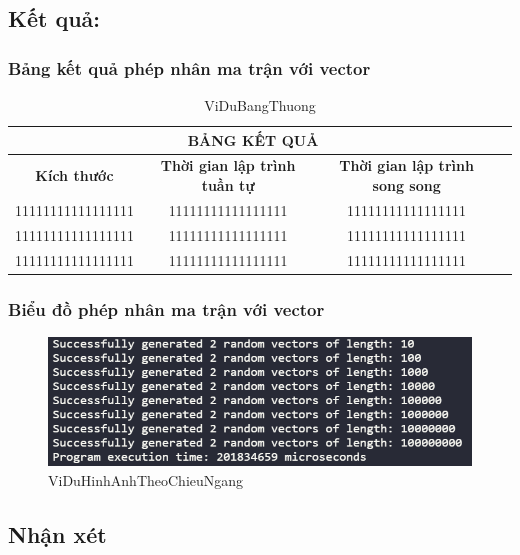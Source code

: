 \subsection{Kết quả:}
\subsubsection{Bảng kết quả phép nhân ma trận với vector}




 
\begin{table}[h] %
 \centering
 \begin{tabular}{|c|c|c|c|}
 
 \hline
 \multicolumn{3}{|c|}{\textbf{BẢNG KẾT QUẢ}} \\ 
 \hline
 \textbf{Kích thước} & \textbf{Thời gian lập trình tuần tự} & \textbf{Thời gian lập trình song song} \\ \hline
 11111111111111111 & 11111111111111111 & 11111111111111111 \\ \hline
 11111111111111111 & 11111111111111111 & 11111111111111111 \\ \hline
 11111111111111111 & 11111111111111111 & 11111111111111111 \\ \hline
 \end{tabular}

 \caption{ViDuBangThuong} %
 \label{table:nghia1} %
 \end{table} 
 
 
 
\subsubsection{Biểu đồ phép nhân ma trận với vector}

 
\begin{figure}[h] %
 \centering
 \includegraphics[width=1\textwidth]{pictures/image.png} %
 \caption{ViDuHinhAnhTheoChieuNgang} %
 \label{pictures:nghia12} %
 \end{figure} 
 

\subsection{Nhận xét}
\lipsum[1]


